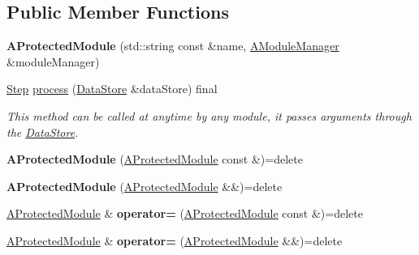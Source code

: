 \subsection*{Public Member Functions}
\begin{DoxyCompactItemize}
\item 
\mbox{\label{classxzia_1_1AProtectedModule_acc2cf8c7c9e47bc6eafbfc8bc3d91c81}} 
{\bfseries A\+Protected\+Module} (std\+::string const \&name, \mbox{\hyperlink{classxzia_1_1AModuleManager}{A\+Module\+Manager}} \&module\+Manager)
\item 
\mbox{\hyperlink{Step_8hpp_a58ad1bb906913f90b95697c49f198770}{Step}} \mbox{\hyperlink{classxzia_1_1AProtectedModule_af8724b0d37b80ed8799c9f6b31dcdc2f}{process}} (\mbox{\hyperlink{classxzia_1_1DataStore}{Data\+Store}} \&data\+Store) final
\begin{DoxyCompactList}\small\item\em This method can be called at anytime by any module, it passes arguments through the \mbox{\hyperlink{classxzia_1_1DataStore}{Data\+Store}}. \end{DoxyCompactList}\item 
\mbox{\label{classxzia_1_1AProtectedModule_a1959fcfb7fdd00910388293af61a84d6}} 
{\bfseries A\+Protected\+Module} (\mbox{\hyperlink{classxzia_1_1AProtectedModule}{A\+Protected\+Module}} const \&)=delete
\item 
\mbox{\label{classxzia_1_1AProtectedModule_a41aa7b1da39e31b13eaf0154bcc660f3}} 
{\bfseries A\+Protected\+Module} (\mbox{\hyperlink{classxzia_1_1AProtectedModule}{A\+Protected\+Module}} \&\&)=delete
\item 
\mbox{\label{classxzia_1_1AProtectedModule_a379d8910a3eba6a36b11ef27b45fd64a}} 
\mbox{\hyperlink{classxzia_1_1AProtectedModule}{A\+Protected\+Module}} \& {\bfseries operator=} (\mbox{\hyperlink{classxzia_1_1AProtectedModule}{A\+Protected\+Module}} const \&)=delete
\item 
\mbox{\label{classxzia_1_1AProtectedModule_a43094897abe3a6efc7ee3b0332bec13f}} 
\mbox{\hyperlink{classxzia_1_1AProtectedModule}{A\+Protected\+Module}} \& {\bfseries operator=} (\mbox{\hyperlink{classxzia_1_1AProtectedModule}{A\+Protected\+Module}} \&\&)=delete
\end{DoxyCompactItemize}
